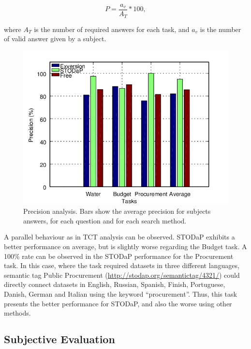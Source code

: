 \begin{equation}
	P = \frac{a_v}{A_T} * 100,
\end{equation}

where $A_T$ is the number of required answers for each task, and $a_v$ is the number of valid answer given by a subject.

\begin{figure}[h!]
\begin{center}
\includegraphics[width=\columnwidth]{images/precision.png}
\caption[Precision analysis.]{Precision analysis. Bars show the average precision for subjects answers, for each question and for each search method.}
\label{fig:precision}
\end{center}
\end{figure}

A parallel behaviour as in TCT analysis can be observed.
STODaP exhibits a better performance on average, but is slightly worse regarding the Budget task.
A 100\% rate can be observed in the STODaP performance for the Procurement task.
In this case, where the task required datasets in three different languages, semantic tag Public Procurement (\url{http://stodap.org/semantictag/4321/}) could directly connect datasets in English, Russian, Spanish, Finish, Portuguese, Danish, German and Italian using the keyword ``procurement''.
Thus, this task presents the better performance for STODaP, and also the worse using other methods.

\subsection{Subjective Evaluation}


